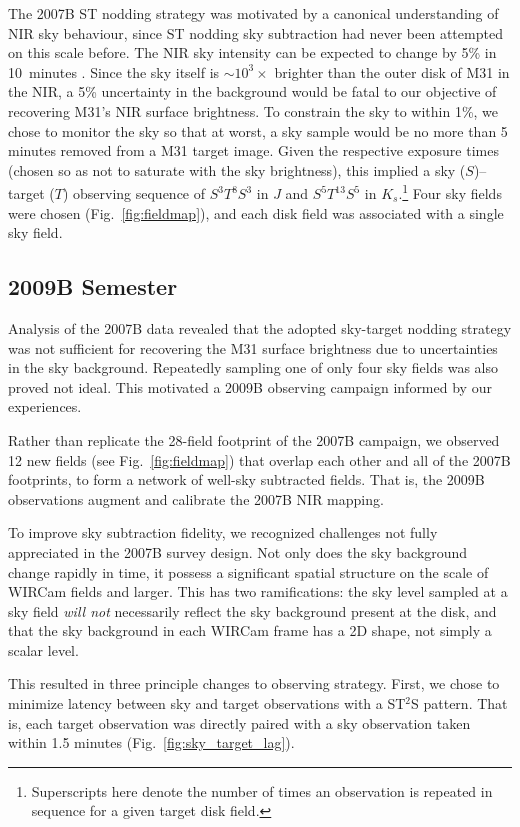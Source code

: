 \documentclass[iop]{emulateapj}
\newcommand{\Fig}[1]{Fig.~\ref{fig:#1}}  %
\begin{document}
The 2007B ST nodding strategy was motivated by a canonical understanding of NIR sky behaviour, since ST nodding sky subtraction had never been attempted on this scale before.
The NIR sky intensity can be expected to change by 5\% in 10~minutes \citep{Adams:1996,Vaduvescu:2004}.
Since the sky itself is $\sim10^3\times$ brighter than the outer disk of M31 in the NIR, a 5\% uncertainty in the background would be fatal to our objective of recovering M31's NIR surface brightness.
To constrain the sky to within 1\%, we chose to monitor the sky so that at worst, a sky sample would be no more than 5 minutes removed from a M31 target image.
Given the respective exposure times (chosen so as not to saturate with the sky brightness), this implied a sky ($S$)--target ($T$) observing sequence of $S^3T^8S^3$ in $J$ and $S^5T^{13}S^5$ in $K_s$.\footnote{Superscripts here denote the number of times an observation is repeated in sequence for a given target disk field.}
Four sky fields were chosen (\Fig{fieldmap}), and each disk field was associated with a single sky field.

\subsection{2009B Semester}
\label{sub:obs9}

Analysis of the 2007B data revealed that the adopted sky-target nodding strategy was not sufficient for recovering the M31 surface brightness due to uncertainties in the sky background.
Repeatedly sampling one of only four sky fields was also proved not ideal.
This motivated a 2009B observing campaign informed by our experiences.

Rather than replicate the 28-field footprint of the 2007B campaign, we observed 12 new fields (see \Fig{fieldmap}) that overlap each other and all of the 2007B footprints, to form a network of well-sky subtracted fields.
That is, the 2009B observations augment and calibrate the 2007B NIR mapping.

To improve sky subtraction fidelity, we recognized challenges not fully appreciated in the 2007B survey design.
Not only does the sky background change rapidly in time, it possess a significant spatial structure on the scale of WIRCam fields and larger.
This has two ramifications: the sky level sampled at a sky field \emph{will not} necessarily reflect the sky background present at the disk, and that the sky background in each WIRCam frame has a 2D shape, not simply a scalar level.

This resulted in three principle changes to observing strategy. First, we chose to minimize latency between sky and target observations with a ST$^2$S pattern. That is, each target observation was directly paired with a sky observation taken within 1.5 minutes (\Fig{sky_target_lag}).
\end{document}
